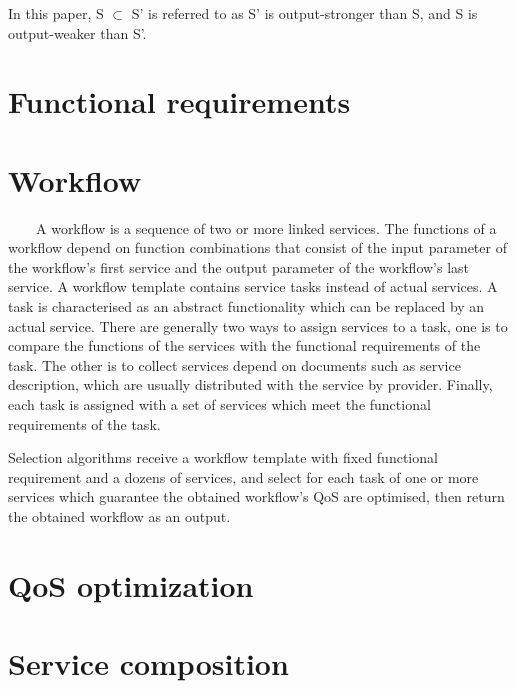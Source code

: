 \documentclass[senior,final,11pt]{iscs-thesis}
\begin{document}
In this paper, S $\subset$ S' is referred to as S' is output-stronger than S, and S is output-weaker than S'.\\

\section{Functional requirements}

\section{Workflow}
~~~~A workflow is a sequence of two or more linked services. The functions of a workflow depend on function combinations that consist of the input parameter of the workflow's first service and the output parameter of the workflow's last service. A workflow template contains service tasks instead of actual services. A task is characterised as an abstract functionality which can be replaced by an actual service. There are generally two ways to assign services to a task, one is to compare the functions of the services with the functional requirements of the task. The other is to collect services depend on documents such as service description, which are usually distributed with the service by provider. Finally, each task is assigned with a set of services which meet the functional requirements of the task.

Selection algorithms receive a workflow template with fixed functional requirement and a dozens of services, and select for each task of one or more services which guarantee the obtained workflow's QoS are optimised, then return the obtained workflow as an output.



\section{QoS optimization}%
\section{Service composition}
\end{document}
